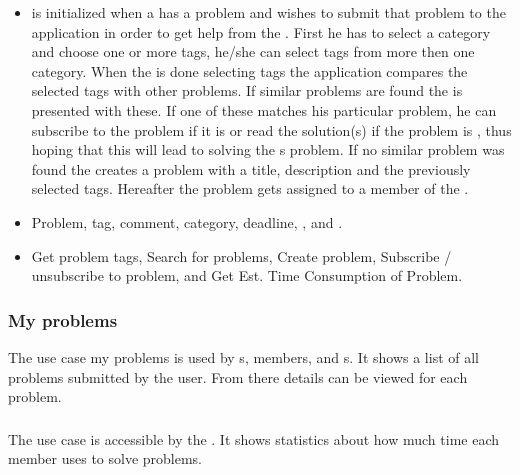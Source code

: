 \begin{itemize}
\item {} \ucsproblem[c] is initialized when a \aclient{} has a problem and wishes to submit that problem to the application in order to get help from the \astaff{}. 
First he has to select a category and choose one or more tags, he/she can select tags from more then one category. 
When the \aclient{} is done selecting tags the application compares the selected tags with other problems. 
If similar problems are found the \aclient{} is presented with these.
If one of these matches his particular problem, he can subscribe to the problem if it is \open[] or read the solution(s) if the problem is \closed{}, thus hoping that this will lead to solving the \aclient[]s problem.
If no similar problem was found the \aclient{} creates a problem with a title, description and the previously selected tags. 
Hereafter the problem gets assigned to a member of the \astaff{}. 

\item {} Problem, tag, comment, category, deadline, \client[], and \staff[].

\item {} Get problem tags, Search for problems, Create problem, Subscribe / unsubscribe to problem, and Get Est. Time Consumption of Problem. 
\end{itemize}



\subsubsection{My problems} The use case my problems is used by  \aclient[]s, \astaff[] members, and \admin[]s. It shows a list of all problems submitted by the user. From there details can be viewed for each problem. 


\subsubsection{\gstat[c]} The use case \gstat[] is accessible by the \admin[]. It shows statistics about how much time each \astaff[] member uses to solve problems.

